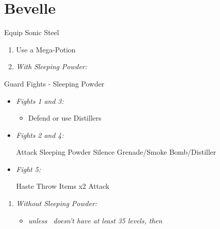 \chapter{Bevelle}
\begin{equip}
\begin{itemize}

  \tidusf Equip Sonic Steel
  \end{itemize}
  \end{equip}
\begin{enumerate}
  \item Use a Mega-Potion
  \columnbreak
  \item \textit{With Sleeping Powder:}
\end{enumerate}
\begin{battle}{Guard Fights - Sleeping Powder}
  \begin{itemize}
    \item \textit{Fights 1 and 3:}
          \begin{itemize}
            \tidusf Attack
            \item Defend or use Distillers
          \end{itemize}
    \item \textit{Fights 2 and 4:}
          \begin{itemize}
            \tidusf Attack
            \rikkuf Sleeping Powder
            \kimahrif Silence Grenade/Smoke Bomb/Distiller
          \end{itemize}
    \item \textit{Fight 5:}
          \begin{itemize}
            \tidusf Haste \rikku
            \rikkuf Throw Items x2
            \tidusf Attack
          \end{itemize}
  \end{itemize}
\end{battle}
\begin{enumerate}[resume]
  \item \textit{Without Sleeping Powder:}
        \begin{itemize}
          \item \formation{\tidus}{\rikku}{\auron} \textit{unless \lulu\ doesn't have at least 35 levels, then } \formation{\tidus}{\rikku}{\lulu}
        \end{itemize}
\end{enumerate}
